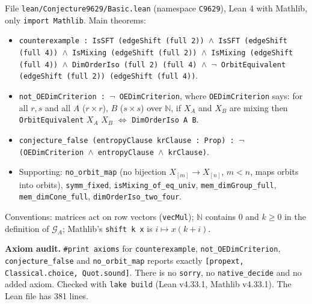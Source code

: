 \documentclass[11pt]{article}
\theoremstyle{definition}
\theoremstyle{remark}
\newcommand{\N}{\mathbb{N}}
\begin{document}
File \texttt{lean/Conjecture9629/Basic.lean} (namespace \texttt{C9629}), Lean 4 with Mathlib, only
\texttt{import Mathlib}. Main theorems:
\begin{itemize}
\item \texttt{counterexample : IsSFT (edgeShift (full 2)) $\wedge$ IsSFT (edgeShift (full 4))
$\wedge$ IsMixing (edgeShift (full 2)) $\wedge$ IsMixing (edgeShift (full 4)) $\wedge$
DimOrderIso (full 2) (full 4) $\wedge$ $\neg$ OrbitEquivalent (edgeShift (full 2)) (edgeShift (full 4))}.
\item \texttt{not\_OEDimCriterion : $\neg$ OEDimCriterion}, where \texttt{OEDimCriterion} says: for all
$r,s$ and all $A$ ($r\times r$), $B$ ($s\times s$) over $\N$, if $X_A$ and $X_B$ are mixing then
\texttt{OrbitEquivalent} $X_A$ $X_B$ $\iff$ \texttt{DimOrderIso A B}.
\item \texttt{conjecture\_false (entropyClause krClause : Prop) : $\neg$ (OEDimCriterion $\wedge$
entropyClause $\wedge$ krClause)}.
\item Supporting: \texttt{no\_orbit\_map} (no bijection $X_{[m]}\to X_{[n]}$, $m<n$, maps orbits into
orbits), \texttt{symm\_fixed}, \texttt{isMixing\_of\_eq\_univ}, \texttt{mem\_dimGroup\_full},
\texttt{mem\_dimCone\_full}, \texttt{dimOrderIso\_two\_four}.
\end{itemize}
Conventions: matrices act on row vectors (\texttt{vecMul}); $\N$ contains $0$ and $k\ge0$ in the
definition of $\mathcal G_A$; Mathlib's \texttt{shift k x} is $i\mapsto x(k+i)$.

\textbf{Axiom audit.} \texttt{\#print axioms} for \texttt{counterexample}, \texttt{not\_OEDimCriterion},
\texttt{conjecture\_false} and \texttt{no\_orbit\_map} reports exactly
\texttt{[propext, Classical.choice, Quot.sound]}. There is no \texttt{sorry}, no
\texttt{native\_decide} and no added axiom. Checked with \texttt{lake build} (Lean v4.33.1,
Mathlib v4.33.1). The Lean file has 381 lines.
\end{document}
